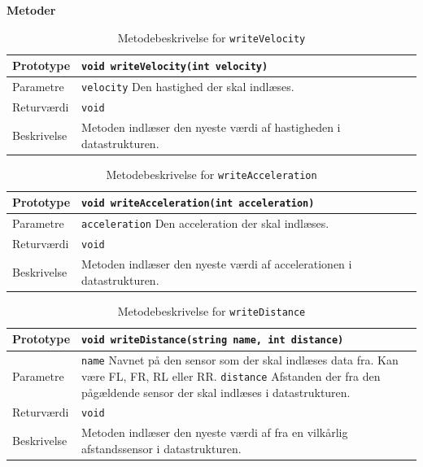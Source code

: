 \textbf{Metoder}

\begin{table}[h]
\begin{tabularx}{\textwidth}{| L{2.5 cm} | Z |} \hline
Prototype & \texttt{void writeVelocity(int velocity)} \\\hline
Parametre & \texttt{velocity} \newline Den hastighed der skal indlæses. \\\hline
Returværdi &  \texttt{void} \newline \\\hline
Beskrivelse & Metoden indlæser den nyeste værdi af hastigheden i datastrukturen. \\\hline
\end{tabularx}
\caption{Metodebeskrivelse for \texttt{writeVelocity}}
\label{table:met_writeVelocity}
\end{table}

\begin{table}[h]
\begin{tabularx}{\textwidth}{| L{2.5 cm} | Z |} \hline
Prototype & \texttt{void writeAcceleration(int acceleration)} \\\hline
Parametre & \texttt{acceleration} \newline Den acceleration der skal indlæses. \\\hline
Returværdi &  \texttt{void} \newline \\\hline
Beskrivelse & Metoden indlæser den nyeste værdi af accelerationen i datastrukturen. \\\hline
\end{tabularx}
\caption{Metodebeskrivelse for \texttt{writeAcceleration}}
\label{table:met_writeAcceleration}
\end{table}

\begin{table}[h]
\begin{tabularx}{\textwidth}{| L{2.5 cm} | Z |} \hline
Prototype & \texttt{void  writeDistance(string name, int distance)} \\\hline
Parametre & \texttt{name} \newline Navnet på den sensor som der skal indlæses data fra. Kan være FL, FR, RL eller RR. \newline \newline
			\texttt{distance} \newline
			Afstanden der fra den pågældende sensor der skal indlæses i datastrukturen.\\\hline
Returværdi &  \texttt{void} \newline \\\hline
Beskrivelse & Metoden indlæser den nyeste værdi af fra en vilkårlig afstandssensor i datastrukturen. \\\hline
\end{tabularx}
\caption{Metodebeskrivelse for \texttt{writeDistance}}
\label{table:met_writeDistance}
\end{table}

